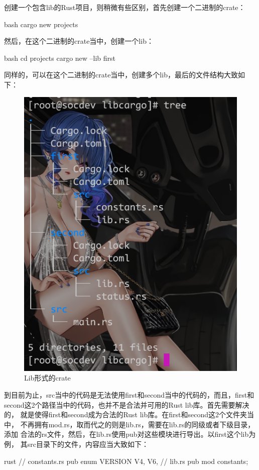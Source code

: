 创建一个包含lib的Rust项目，则稍微有些区别，首先创建一个二进制的crate：
\begin{code-block}{bash}
cargo new projects
\end{code-block}
然后，在这个二进制的crate当中，创建一个lib：
\begin{code-block}{bash}
cd projects
cargo new --lib first
\end{code-block}
同样的，可以在这个二进制的crate当中，创建多个lib，最后的文件结构大致如下：
\begin{figure}[H]
  \centering
  \includegraphics[scale=0.5]{rust_lib.png}
  \caption{Lib形式的crate}
  \label{fig:rust_lib}
\end{figure}

到目前为止，src当中的代码是无法使用first和second当中的代码的，而且，first和
second这2个路径当中的代码，也并不是合法并可用的Rust lib库。首先需要解决的，
就是使得first和second成为合法的Rust lib库。在first和second这2个文件夹当中，
不再拥有mod.rs，取而代之的则是lib.rs，需要在lib.rs的同级或者下级目录，添加
合法的rs文件，然后，在lib.rs使用pub对这些模块进行导出。以first这个lib为例，
其src目录下的文件，内容应当大致如下：
\begin{code-block}{rust}
// constants.rs
pub enum VERSION {
    V4,
    V6,
}
// lib.rs
pub mod constants;
\end{code-block}


